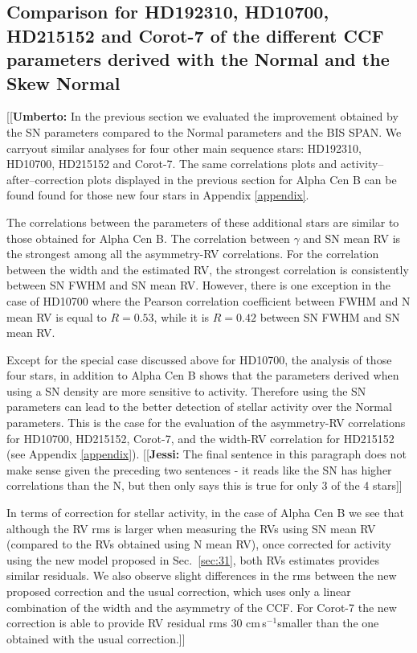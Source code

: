 \documentclass{aa}
\def\cms{\hbox{\,cm\,s$^{-1}$}}       %
\newcommand{\jessi}[1]{{\color{Purple}[[\textbf{Jessi: }#1]]}}
\newcommand{\umberto}[1]{{\color{green}[[\textbf{Umberto: }#1]]}}
\begin{document}
\subsection{Comparison for HD192310, HD10700, HD215152 and Corot-7 of the different CCF parameters derived with the Normal and the Skew Normal} \label{sec:real_data_other_stars}

\umberto{In the previous section we evaluated the improvement obtained by the SN parameters compared to the Normal parameters and the BIS SPAN. We carryout similar analyses for four other main sequence stars: HD192310, HD10700, HD215152 and Corot-7. The same correlations plots and activity--after--correction plots displayed in the previous section for Alpha Cen B can be found found for those new four stars in Appendix \ref{appendix}.

The correlations between the parameters of these additional stars are similar to those obtained for Alpha Cen B. The correlation between $\gamma$ and SN mean RV is the strongest among all the asymmetry-RV correlations. For the correlation between the width and the estimated RV, the strongest correlation is consistently between SN FWHM and SN mean RV. However, there is one exception in the case of HD10700 where the Pearson correlation coefficient between FWHM and N mean RV is equal to $R=0.53$, while it is $R=0.42$ between SN FWHM and SN mean RV.

Except for the special case discussed above for HD10700, the analysis of those four stars, in addition to Alpha Cen B shows that the parameters derived when using a SN density are more sensitive to activity.  Therefore using the SN parameters can lead to the better detection of stellar activity over the Normal parameters. 
This is the case for the evaluation of the asymmetry-RV correlations for HD10700, HD215152, Corot-7, and the width-RV correlation for HD215152 (see Appendix \ref{appendix}).  \jessi{The final sentence in this paragraph does not make sense given the preceding two sentences - it reads like the SN has higher correlations than the N, but then only says this is true for only 3 of the 4 stars}

In terms of correction for stellar activity, in the case of Alpha Cen B we see that although the RV rms is larger when measuring the RVs using SN mean RV (compared to the RVs obtained using N mean RV), once corrected for activity using the new model proposed in Sec.~\ref{sec:31}, both RVs estimates provides similar residuals. We also observe slight differences in the rms between the new proposed correction and the usual correction, which uses only a linear combination of the width and the asymmetry of the CCF.  For Corot-7 the new correction is able to provide RV residual rms 30\,\cms smaller than the one obtained with the usual correction.}
\end{document}
